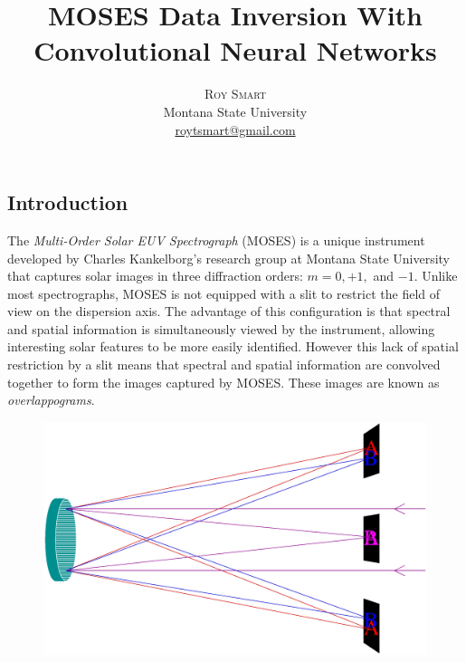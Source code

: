\documentclass[twoside]{article}
\title{\vspace{-15mm}\fontsize{24pt}{10pt}\selectfont\textbf{MOSES Data Inversion With Convolutional Neural Networks}} %
\author{
\large
\textsc{Roy Smart}\\[2mm] %
\normalsize Montana State University \\ %
\normalsize \href{mailto:roytsmart@gmail.com}{roytsmart@gmail.com} %
\vspace{-5mm}
}
\date{}
\begin{document}
\maketitle %

\thispagestyle{fancy} %




\begin{multicols}{2} %

\section{Introduction}
The \textit{Multi-Order Solar EUV Spectrograph} (MOSES) is a unique instrument developed by Charles Kankelborg's research group at Montana State University that captures solar images in three diffraction orders: $m=0,+1,$ and $-1$. Unlike most spectrographs, MOSES is not equipped with a slit to restrict the field of view on the dispersion axis. The advantage of this configuration is that spectral and spatial information is simultaneously viewed by the instrument, allowing interesting solar features to be more easily identified. However this lack of spatial restriction by a slit means that spectral and spatial information are convolved together to form the images captured by MOSES. These images are known as \textit{overlappograms}. \par
\begin{figure}[H]
	\includegraphics[width=\linewidth]{images/instrument.eps}

\end{figure}
\end{multicols}
\end{document}
